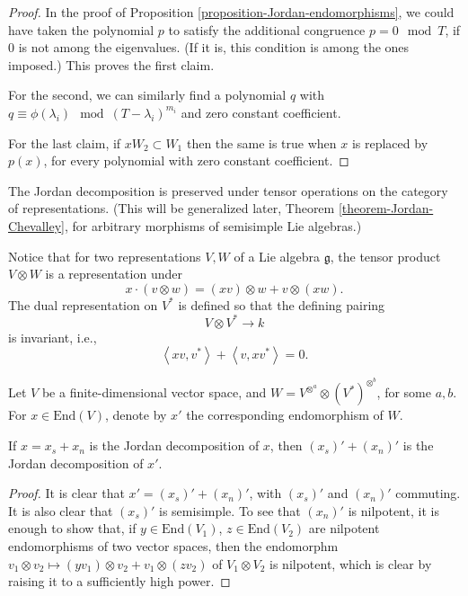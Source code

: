 \begin{proof}
 In the proof of Proposition \ref{proposition-Jordan-endomorphisms}, we could have taken the polynomial $p$ to satisfy the additional congruence $p = 0 \mod T$, if $0$ is not among the eigenvalues. (If it is, this condition is among the ones imposed.) This proves the first claim.
 
 For the second, we can similarly find a polynomial $q$ with $q\equiv \phi(\lambda_i) \mod (T-\lambda_i)^{m_i}$ and zero constant coefficient. 
 
 For the last claim, if $xW_2\subset W_1$ then the same is true when $x$ is replaced by $p(x)$, for every polynomial with zero constant coefficient.
\end{proof}


The Jordan decomposition is preserved under tensor operations on the category of representations. (This will be generalized later, Theorem \ref{theorem-Jordan-Chevalley}, for arbitrary morphisms of semisimple Lie algebras.)

Notice that for two representations $V, W$ of a Lie algebra $\mathfrak g$, the tensor product $V\otimes W$ is a representation under 
$$ x \cdot (v\otimes w) = (xv)\otimes w + v\otimes (xw).$$
The dual representation on $V^*$ is defined so that the defining pairing
$$ V\otimes V^*\to k$$ 
is invariant, i.e., 
\begin{equation}
 \label{equation-dual-representation-Liealgebra}
\left< xv, v^*\right> + \left < v, xv^*\right> =0.
\end{equation}

\begin{lemma}
\label{lemma-Jordan-tensors}
Let $V$ be a finite-dimensional vector space, and $W = V^{\otimes^a}\otimes (V^*)^{\otimes^b}$, for some $a, b$. For $x\in \text{End}(V)$, denote by $x'$ the corresponding endomorphism of $W$.

If $x=x_s + x_n$ is the Jordan decomposition of $x$, then $(x_s)'+(x_n)'$ is the Jordan decomposition of $x'$. 
\end{lemma}


\begin{proof}
 It is clear that $x'=(x_s)'+(x_n)'$, with $(x_s)'$ and $(x_n)'$ commuting. It is also clear that $(x_s)'$ is semisimple. To see that $(x_n)'$ is nilpotent, it is enough to show that, if $y\in \text{End}(V_1)$, $z\in \text{End}(V_2)$ are nilpotent endomorphisms of two vector spaces, then the endomorphm $v_1\otimes v_2\mapsto (yv_1) \otimes v_2 + v_1 \otimes (zv_2)$ of $V_1\otimes V_2$ is nilpotent, which is clear by raising it to a sufficiently high power.
\end{proof}





